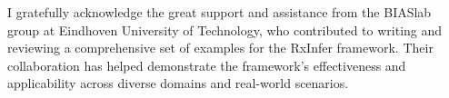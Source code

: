 I gratefully acknowledge the great support and assistance from the BIASlab group at Eindhoven University of Technology, who contributed to writing and reviewing a comprehensive set of examples for the RxInfer framework.
Their collaboration has helped demonstrate the framework's effectiveness and applicability
across diverse domains and real-world scenarios.
